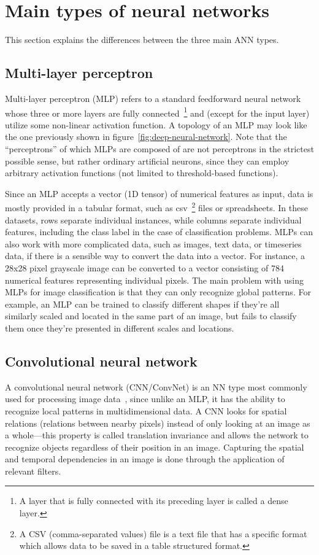 \section{Main types of neural networks}
\label{main-types-of-neural-networks}
This section explains the differences between the three main ANN types.


\subsection*{Multi-layer perceptron}
\label{multi-layer-perceptron}
Multi-layer perceptron (MLP) refers to a standard feedforward neural network whose three or more layers are fully
connected~\footnote{A layer that is fully connected with its preceding layer is called a dense layer.}
and (except for the input layer) utilize some non-linear activation function.
A topology of an MLP may look like the one previously shown in figure~\ref{fig:deep-neural-network}.
Note that the ``perceptrons'' of which MLPs are composed of are not perceptrons in the strictest possible sense,
but rather ordinary artificial neurons,
since they can employ arbitrary activation functions (not limited to threshold-based functions).

Since an MLP accepts a vector (1D tensor) of numerical features as input, data is mostly
provided in a tabular format, such as csv~\footnote{A CSV (comma-separated values) file is a text file that has a
specific format which allows data to be saved in a table structured format.}
files or spreadsheets.
In these datasets, rows separate individual instances, while columns
separate individual features, including the class label in the case of classification problems.
MLPs can also work with more complicated data, such as images, text data, or timeseries data,
if there is a sensible way to convert the data into a vector. For instance, a 28x28 pixel grayscale image can be converted
to a vector consisting of 784 numerical features representing individual pixels.
The main problem with using MLPs for image classification is that they can only recognize global patterns.
For example, an MLP can be trained to classify different shapes if they're all similarly scaled and located in the same
part of an image, but fails to classify them once they're presented in different scales and locations.




\subsection*{Convolutional neural network}
\label{convolutional-neural-network}
A convolutional neural network (CNN/ConvNet) is an NN type most commonly used
for processing image data~\cite{cnn2015introduction},
since unlike an MLP, it has the ability to recognize local patterns in multidimensional data.
A CNN looks for spatial relations (relations between nearby pixels)
instead of only looking at an image as a whole---this property is called translation invariance
and allows the network to recognize objects regardless of their position in an image.
Capturing the spatial and temporal dependencies in an image is done through the
application of relevant filters.

